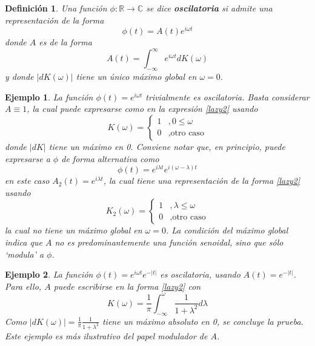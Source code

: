 \documentclass[12pt,letterpaper]{book}
\newtheorem{definicion}{Definición}[chapter]
\newtheorem{ejemplo}{Ejemplo}[chapter]
\newcommand{\R}{\mathbb{R}}
\newcommand{\C}{\mathbb{C}}
\newcommand{\intR}{\int_{-\infty}^{\infty}}
\newcommand{\abso}[1]{\left| #1 \right|}
\begin{document}

\begin{definicion}
Una función $\phi: \R \rightarrow \C$ se dice \textbf{oscilatoria} si admite una representación de la forma
\begin{equation}
\phi(t) = A(t) e^{i \omega t} 
\end{equation}
donde $A$ es de la forma
\begin{equation}
A(t) = \intR e^{i \omega t} dK(\omega)
\label{lazy2}
\end{equation}
y donde $\abso{dK(\omega)}$ tiene un único máximo global en $\omega = 0$.
\label{oscilatorio}
\end{definicion}

\begin{ejemplo}
La función $\phi(t) = e^{i \omega t}$ trivialmente es oscilatoria. 
%
Basta considerar $A \equiv 1$, la cual puede expresarse como en la expresión \ref{lazy2} usando \begin{equation}
K(\omega) = \begin{cases}
1 &, 0 \leq \omega \\
0 &, \text{otro caso}
\end{cases}
\end{equation}
donde $\abso{dK}$ tiene un máximo en 0. Conviene notar que, en principio, puede expresarse a $\phi$ de forma alternativa como
\begin{equation}
\phi(t) = e^{i \lambda t} e^{i (\omega-\lambda) t}
\end{equation} 
en este caso $A_2(t) = e^{i \lambda t}$, la cual tiene una representación de la forma \ref{lazy2} usando
\begin{equation}
K_2(\omega) = \begin{cases}
1 &, \lambda \leq \omega \\
0 &, \text{otro caso}
\end{cases}
\end{equation}
la cual no tiene un máximo global en $\omega=0$.
%
La condición del máximo global indica que $A$ no es \textit{predominantemente} una función senoidal, sino que sólo \textit{`modula'} a $\phi$.
\label{ejemplo:sen_cos_oscilatorios}
\end{ejemplo}

\begin{ejemplo}
La función $\phi(t) = e^{i \omega t} e^{-\abso{t}}$ es oscilatoria, usando $A(t) = e^{-\abso{t}}$.
% 
Para ello, $A$ puede escribirse en la forma \ref{lazy2} con 
\begin{equation}
K(\omega) = \frac{1}{\pi} \int_{-\infty}^{\omega}  \frac{1}{1+\lambda^2} d\lambda
\end{equation}
Como $\abso{dK(\omega)} = \frac{1}{\pi} \frac{1}{1+\lambda^2} $ tiene un máximo absoluto en 0, se concluye la prueba. 
%
Este ejemplo es más ilustrativo del papel modulador de $A$.
\end{ejemplo}
\end{document}
